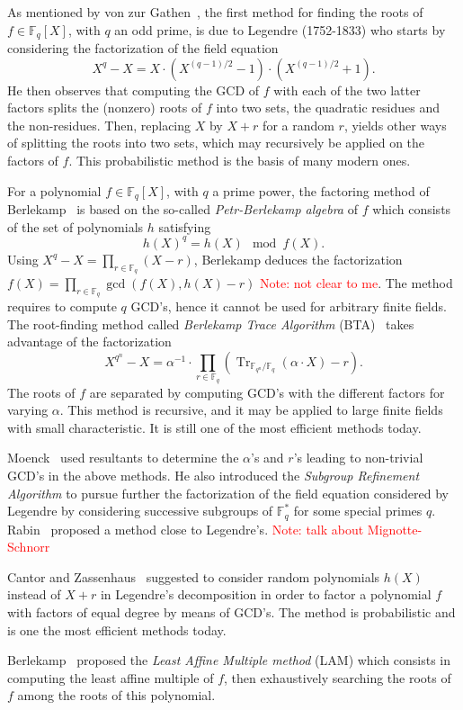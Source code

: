 \documentclass{article}
\newcommand{\ff}[1]{\mathbb{F}_{#1}}
\DeclareMathOperator{\Tr}{Tr}
\newcommand{\Notes}[1]{\textcolor{red}{Note: #1}}
\begin{document}
As mentioned by von zur Gathen~\cite{Gathen06}, the first method for
finding the roots of $f∈\ff{q}[X]$, with $q$ an odd prime,
is due to Legendre (1752-1833) who starts by considering the
factorization of the field equation
$$X^q-X=X · (X^{(q-1)/2}-1) · (X^{(q-1)/2}+1).$$
He then observes that computing the GCD of $f$ with each of the two
latter factors splits the (nonzero) roots of $f$ into two sets, the
quadratic residues and the non-residues. Then, replacing $X$ by $X+r$
for a random $r$, yields other ways of splitting the roots into two
sets, which may recursively be applied on the factors of $f$. This
probabilistic method is the basis of many modern ones.

For a polynomial $f∈\ff{q}[X]$, with $q$ a prime power, the
factoring method of Berlekamp~\cite{berl67} is based on the so-called
\emph{Petr-Berlekamp algebra} of $f$ which consists of the set of
polynomials $h$ satisfying
$$h(X)^q=h(X) \mod{f(X)}.$$
Using $X^{q}-X=\prod_{r∈\ff{q}}(X-r)$, Berlekamp deduces the
factorization $f(X)=\prod_{r ∈ \ff{q}} \gcd(f(X),h(X)-r)$ \Notes{not
  clear to me}. The method requires to compute $q$ GCD's, hence it
cannot be used for arbitrary finite fields. The root-finding method
called \emph{Berlekamp Trace Algorithm} (BTA)~\cite{berl70} takes
advantage of the factorization
$$X^{q^n}-X=α^{-1} · \prod_{r ∈ \ff{q}}(\Tr_{\ff{q^n}/\ff{q}}(α · X)-r).$$
The roots of $f$ are separated by computing GCD's with the different
factors for varying $α$. This method is recursive, and it may be
applied to large finite fields with small characteristic. It is still
one of the most efficient methods today.

Moenck~\cite{Moenck77} used resultants to determine the $α$'s and
$r$'s leading to non-trivial GCD's in the above methods. He also
introduced the \emph{Subgroup Refinement Algorithm} to pursue further
the factorization of the field equation considered by Legendre by
considering successive subgroups of $\ff{q}^\ast$ for some
special primes $q$.  Rabin~\cite{Rabin79} proposed a method close to
Legendre's. \Notes{talk about Mignotte-Schnorr}

Cantor and Zassenhaus~\cite{cantor1981} suggested to consider random
polynomials $h(X)$ instead of $X+r$ in Legendre's decomposition in
order to factor a polynomial $f$ with factors of equal degree by means
of GCD's. The method is probabilistic and is one the most efficient
methods today.

Berlekamp~\cite{mBER84a} proposed the \emph{Least Affine Multiple
  method} (LAM) which consists in computing the least affine multiple
of $f$, then exhaustively searching the roots of $f$ among the roots
of this polynomial.
\end{document}
